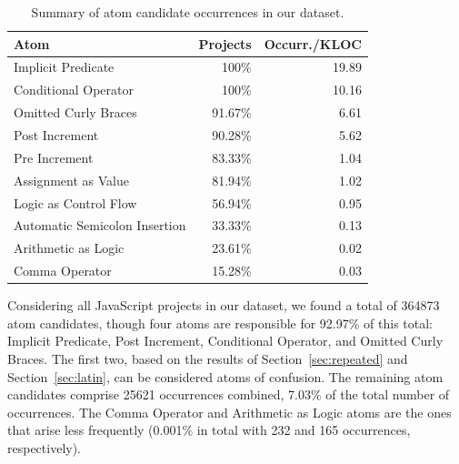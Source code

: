 \begin{table}[ht]
  \centering
  {\scriptsize 
\caption{Summary of atom candidate occurrences in our dataset.}
\label{tab:occurrences-summary}
\setlength\tabcolsep{2pt} %
\begin{tabular}{lrr}%
  \toprule
Atom & Projects & Occurr./KLOC \\%
  \midrule
Implicit Predicate & 100\% & 19.89 \\%
  Conditional Operator & 100\% & 10.16 \\%
  Omitted Curly Braces & 91.67\% & 6.61 \\%
  Post Increment & 90.28\% & 5.62 \\%
  Pre Increment & 83.33\% & 1.04 \\%
  Assignment as Value & 81.94\% & 1.02 \\%
  Logic as Control Flow & 56.94\% & 0.95 \\%
  Automatic Semicolon Insertion & 33.33\% & 0.13 \\%
  Arithmetic as Logic & 23.61\% & 0.02 \\%
  Comma Operator & 15.28\% & 0.03 \\%
   \bottomrule
\end{tabular}
  }
\end{table}


Considering all JavaScript projects in our dataset, we found a total of \num{364873} atom candidates, though four atoms are responsible
for 92.97\% of this total: Implicit Predicate, Post Increment, Conditional Operator, and Omitted Curly Braces. The first two, based on the results of Section~\ref{sec:repeated} and Section~\ref{sec:latin}, can be considered atoms of confusion. The remaining atom
candidates comprise \num{25621} occurrences combined, 7.03\% of the total number of occurrences.
The Comma Operator and Arithmetic as Logic atoms are the ones that arise less
frequently (0.001\% in total with 232 and 165 occurrences, respectively). 

